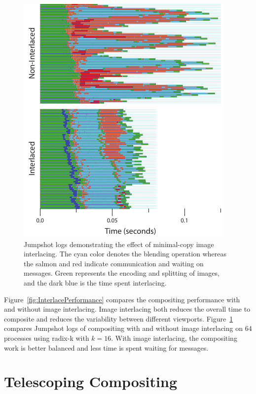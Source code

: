 \documentclass{vgtc}                          %
\begin{document}
\begin{figure}[htbp]
  \centering
  \includegraphics{images/InterlaceJumpshot}
  \caption{Jumpshot logs demonstrating the effect of minimal-copy image
    interlacing.  The cyan color denotes the blending operation whereas the
    salmon and red indicate communication and waiting on messages.  Green
    represents the encoding and splitting of images, and the dark blue is
    the time spent interlacing.}
  \label{fig:InterlaceJumpshot}
\end{figure}

Figure~\ref{fig:InterlacePerformance} compares the compositing
performance with and without image interlacing.  Image interlacing both
reduces the overall time to composite and reduces the variability between
different viewports.  Figure~\ref{fig:InterlaceJumpshot} compares
Jumpshot logs of compositing with and without image interlacing on 64
processes using radix-k with $k = 16$.  With image interlacing, the
compositing work is better balanced and less time is spent waiting for
messages.

\section{Telescoping Compositing}
\label{sec:TelescopingCompositing}
\end{document}

